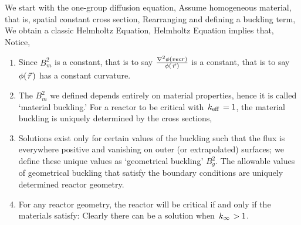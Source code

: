 \documentclass{school-22.211-notes}
\date{March 19, 2012}
\begin{document}
\maketitle

We start with the one-group diffusion equation,
Assume homogeneous material, that is, spatial constant cross section,
Rearranging and defining a buckling term, 
We obtain a classic Helmholtz Equation,
Helmholtz Equation implies that,
Notice,
\begin{enumerate}
\item Since $B_m^2$ is a constant, that is to say $\frac{\nabla^2 \phi(vecr)}{\phi(\left.\vec{r}\right.)}$ is a constant, that is to say $\phi(\left.\vec{r}\right.)$ has a constant curvature. 
\item The $B_m^2$ we defined depends entirely on material properties, hence it is called `material buckling.' For a reactor to be critical with $\left. k_{\mathrm{eff}} \right. = 1$, the material buckling is uniquely determined by the cross sections, 
\item Solutions exist only for certain values of the buckling such that the flux is everywhere positive and vanishing on outer (or extrapolated) surfaces; we define these unique values as `geometrical buckling' $B_g^2$. The allowable values of geometrical buckling that satisfy the boundary conditions are uniquely determined reactor geometry.
\item For any reactor geometry, the reactor will be critical if and only if the materials satisfy:
Clearly there can be a solution when $\left. k_{\infty} \right. > 1$. 
\end{enumerate}
\end{document}
